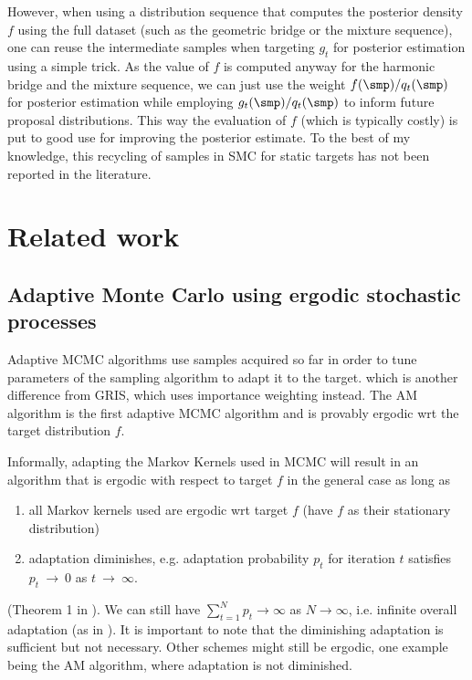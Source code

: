 However, when using a distribution sequence that computes the posterior density $f$ using the full dataset (such as the geometric bridge or the mixture sequence), one can reuse the intermediate samples when targeting $g_t$ for posterior estimation using a simple trick. As the value of $f$ is computed anyway for the harmonic bridge and the mixture sequence, we can just use the weight $f(\smp)/q_t(\smp)$ for posterior estimation while employing $g_t(\smp)/q_t(\smp)$ to inform future proposal distributions. This way the evaluation of $f$ (which is typically costly) is put to good use for improving the posterior estimate. To the best of my knowledge, this recycling of samples in SMC for static targets has not been reported in the literature.

\section{Related work}
\label{sec:relwork}

\subsection{Adaptive Monte Carlo using ergodic stochastic processes}

Adaptive MCMC algorithms use samples acquired so far in order to tune parameters of the sampling algorithm to adapt it to the  target.  which is another difference from GRIS, which uses importance weighting instead. The AM algorithm is the first adaptive MCMC algorithm and is provably ergodic wrt the target distribution $f$.

Informally, adapting the Markov Kernels used in MCMC will result in an algorithm that is ergodic with respect to target $f$ in the general case as long as 
\begin{enumerate}
	\item all Markov kernels used are ergodic wrt target $f$ (have $f$ as their stationary distribution)
	\item adaptation diminishes, e.g. adaptation probability $p_t$ for iteration $t$ satisfies $p_t~\rightarrow~0$ as $t~\rightarrow~\infty$.
\end{enumerate}
(Theorem 1 in \cite{Roberts2007}). We can still have $\sum^N_{t=1}p_t {\rightarrow} \infty$ as $N\rightarrow\infty$, i.e. infinite overall adaptation (as in \cite{Sejdinovic2013}). It is important to note that the diminishing adaptation is sufficient but not necessary. Other schemes might still be ergodic, one example being the AM algorithm, where adaptation is not diminished.


